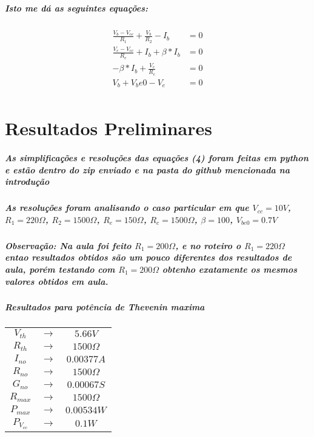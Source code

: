 \documentclass[12pt,twoside, a4paper, twocolumn]{article}
\begin{document}
\subparagraph*{Isto me dá as seguintes equações:}

\begin{equation}
    \begin{aligned}
        \frac{V_b - V_{cc}}{R_1} + \frac{V_b}{R_2} - I_b & = 0 \\
        \frac{V_e - V_{cc}}{R_e} + I_b + \beta*I_b       & = 0 \\
        -\beta*I_b + \frac{V_c}{R_c}                     & = 0 \\
        V_b + {V_be0} - V_e                              & = 0 \\
    \end{aligned}
\end{equation}

\section{Resultados Preliminares}

\subparagraph*{As simplificações e resoluções das equações (4) foram feitas em python e estão dentro do zip enviado e na pasta do github mencionada na introdução}

\subparagraph*{As resoluções foram analisando o caso particular em que $V_{cc} = 10V$, $R_1 = 220 \varOmega$, $R_2 = 1500 \varOmega$, $R_e = 150\varOmega$, $R_c = 1500\varOmega$, $\beta = 100$, $V_{be0} = 0.7V$}

\subparagraph*{Observação: Na aula foi feito $R_1 = 200 \varOmega$, e no roteiro o $R_1 = 220 \varOmega$ entao resultados obtidos são um pouco diferentes dos resultados de aula, porém testando com $R_1 = 200 \varOmega$ obtenho exatamente os mesmos valores obtidos em aula.}


\subparagraph*{Resultados para potência de Thevenin maxima}

\begin{center}
    \begin{tabular}{ |ccc| }
        \hline
        $V_{th}$     & $\rightarrow$ & $5.66V$          \\
        $R_{th}$     & $\rightarrow$ & $1500 \varOmega$ \\
        $I_{no}$     & $\rightarrow$ & $0.00377 A$      \\
        $R_{no}$     & $\rightarrow$ & $1500 \varOmega$ \\
        $G_{no}$     & $\rightarrow$ & $0.00067 S$      \\
        $R_{max}$    & $\rightarrow$ & $1500 \varOmega$ \\
        $P_{max}$    & $\rightarrow$ & $0.00534W$       \\
        $P_{V_{cc}}$ & $\rightarrow$ & $0.1W$           \\

        \hline
    \end{tabular}
\end{center}
\end{document}

